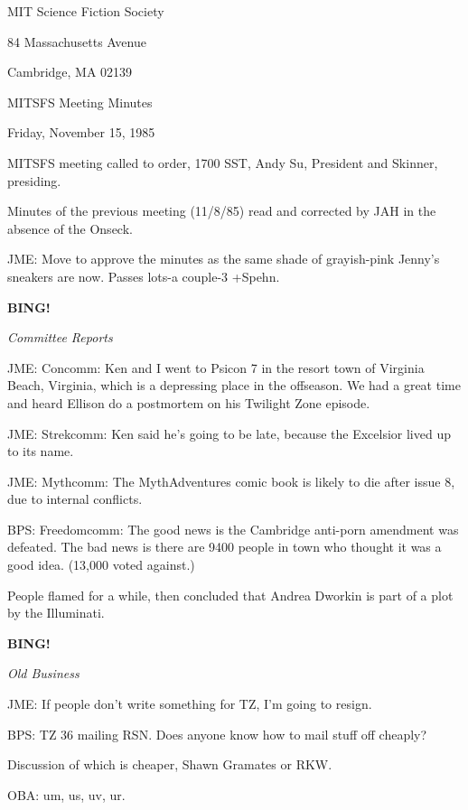 \documentclass[12pt]{article}
\newcommand{\bing}{{\bf BING!} }
\newcommand{\goto}[1]{\bing \vskip 12pt \centerline{{\em{#1}}}}
\begin{document}
\begin{center}

MIT Science Fiction Society 

84 Massachusetts Avenue

Cambridge, MA 02139

\vspace{12pt}

MITSFS Meeting Minutes 

Friday, November 15, 1985

\end{center}
 
\vspace{18pt}

\setlength{\parskip}{6pt}

\noindent
MITSFS meeting called to order, 1700 SST,
Andy Su, President and Skinner, presiding.

Minutes of the previous meeting (11/8/85) read and corrected by JAH in the absence of the Onseck.

JME: Move to approve the minutes as the same shade of grayish-pink Jenny's sneakers are now. Passes lots-a couple-3 +Spehn.

\goto{Committee Reports}

JME: Concomm: Ken and I went to Psicon 7 in the resort town of Virginia Beach, Virginia, which is a depressing place in the offseason. We had a great time and heard Ellison do a postmortem on his Twilight Zone episode.

JME: Strekcomm: Ken said he's going to be late, because the Excelsior lived up to its name.

JME: Mythcomm: The MythAdventures comic book is likely to die after issue 8, due to internal conflicts.

BPS: Freedomcomm: The good news is the Cambridge anti-porn amendment was defeated. The bad news is there are 9400 people in town who thought it was a good idea. (13,000 voted against.)

People flamed for a while, then concluded that Andrea Dworkin is part of a plot by the Illuminati.

\goto{Old Business}

JME: If people don't write something for TZ, I'm going to resign.

BPS: TZ 36 mailing RSN. Does anyone know how to mail stuff off cheaply?

Discussion of which is cheaper, Shawn Gramates or RKW.

OBA: um, us, uv, ur.
\end{document}

